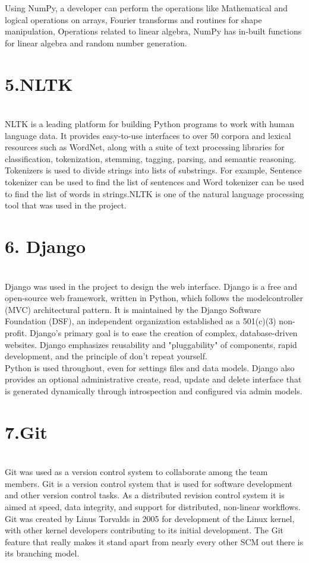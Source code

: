 Using NumPy, a developer can perform the operations like Mathematical and logical operations on arrays, Fourier transforms and routines for shape manipulation, Operations related to linear algebra, NumPy has in-built functions for linear algebra and random number generation.\\

\chapter{\textbf{5.NLTK }}\\
NLTK is a leading platform for building Python programs to work with human language data. It provides easy-to-use interfaces to over 50 corpora and lexical resources such as WordNet, along with a suite of text processing libraries for classification, tokenization, stemming, tagging, parsing, and semantic reasoning. Tokenizers is used to divide strings into lists of substrings. For example, Sentence tokenizer can be used to find the list of sentences and Word tokenizer can be used to find the list of words in strings.NLTK is one of the natural language processing tool that was used in the project.\\

\chapter{\textbf{6. Django}}\\
Django was used in the project to design the web interface. Django is a free and open-source web framework, written in Python, which follows the modelcontroller (MVC) architectural pattern. It is maintained by the Django Software Foundation (DSF), an independent organization established as a 501(c)(3) non-profit. Django's primary goal is to ease the creation of complex, database-driven websites. Django emphasizes reusability and "pluggability" of components, rapid development, and the principle of don't repeat yourself.\\
 
Python is used throughout, even for settings files and data models. Django also provides an optional administrative create, read, update and delete interface that is generated dynamically through introspection and configured via admin models. 

\chapter{\textbf{7.Git}}\\
Git was used as a version control system to collaborate among the team members. Git is a version control system that is used for software development and other version control tasks. As a distributed revision control system it is aimed at speed, data integrity, and support for  distributed, non-linear workflows. Git was created by Linus Torvalds in 2005 for development of the Linux kernel, with other kernel developers contributing to its initial development. The Git feature that really makes it stand apart from nearly every other SCM out there is its branching model. \\


